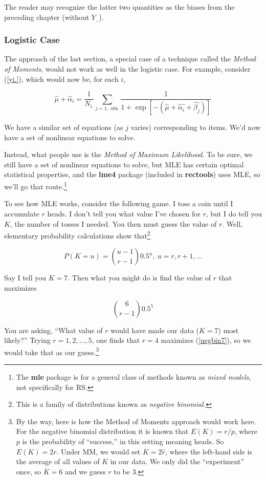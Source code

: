 The reader may recognize the latter two quantities as the biases from
the preceding chapter (without $Y_{..}$).

\subsubsection{Logistic Case}

The approach of the last section, a special case of a technique called
the \textit{Method of Moments}, would not work as well in the logistic
case.  For example, consider (\ref{yi.}), which would now be, for each
$i$,

\begin{equation}
\label{nonlin1}
\widehat{\mu} + \widehat{\alpha}_i = 
\frac{1}{N_{i.}} \sum_{j=1, \textrm{ obs.}}
\frac{1}{1 + \exp[-(\widehat{\mu} + \widehat{\alpha_i} + \widehat{\beta_j})]}
\end{equation}

We have a similar set of equations (as $j$ varies) corresponding to
items.  We'd now have a set of nonlinear equations to solve.

Instead, what people use is the \textit{Method of Maximum Likelihood}.
To be sure, we still have a set of nonlinear equations to solve, but MLE
has certain optimal statistical properties, and the \textbf{lme4}
package (included in \textbf{rectools}) uses MLE, so we'll go that
route.\footnote{The \textbf{mle} package is for a general class of
methods known as \textit{mixed models}, not specifically for RS.}

To see how MLE works, consider the following game.  I toss a coin until
I accumulate $r$ heads.  I don't tell you what value I've chosen for
$r$, but I do tell you $K$, the number of tosses I needed.  You then
must guess the value of $r$.  Well, elementary probability calculations 
show that\footnote{This is a family of distributions known as
\textit{negative binomial.}}

\begin{equation}
\label{negbin}
P(K = u) = \binom{u-1}{r-1} 0.5^u,~ u = r, r+1, ...
\end{equation}

Say I tell you $K = 7$.  Then what you might do is find the value of $r$
that maximizes 

\begin{equation}
\label{negbin7}
\binom{6}{r-1} 0.5^5
\end{equation}

You are asking, ``What value of $r$ would have made our data ($K = 7$)
most likely?''  Trying $r = 1,2,...,5$, one finds that $r = 4$ maximizes
(\ref{negbin7}), so we would take that as our guess.\footnote{By the
way, here is how the Method of Moments approach would work here. For the
negative binomial distribution it is known that $E(K) = r/p$, where $p$
is the probability of ``success,'' in this setting meaning heads.  So
$E(K) = 2r$.  Under MM, we would set $\overline{K} = 2 \widehat{r}$,
where the left-hand side is the average of all values of $K$ in our
data.  We only did the ``experiment'' once, so $\overline{K} = 6$ and we
guess $r$ to be 3.}

